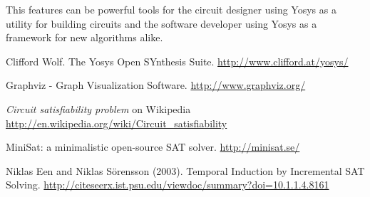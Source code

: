 \documentclass[9pt,technote,a4paper]{IEEEtran}
\begin{document}
This features can be powerful tools for the circuit designer using Yosys as a
utility for building circuits and the software developer using Yosys as a
framework for new algorithms alike.

\begin{thebibliography}{9}

Clifford Wolf. The Yosys Open SYnthesis Suite.
\url{http://www.clifford.at/yosys/}

Graphviz - Graph Visualization Software.
\url{http://www.graphviz.org/}

{\it Circuit satisfiability problem} on Wikipedia
\url{http://en.wikipedia.org/wiki/Circuit_satisfiability}

MiniSat: a minimalistic open-source SAT solver.
\url{http://minisat.se/}

Niklas Een and Niklas Sörensson (2003).
Temporal Induction by Incremental SAT Solving.
\url{http://citeseerx.ist.psu.edu/viewdoc/summary?doi=10.1.1.4.8161}

\end{thebibliography}
\end{document}
